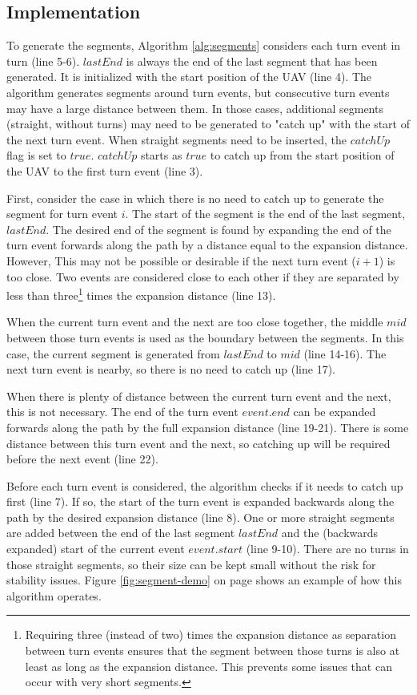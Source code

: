 \subsection{Implementation}
To generate the segments, Algorithm \ref{alg:segments} considers each turn event in turn (line 5-6). $lastEnd$ is always the end of the last segment that has been generated. It is initialized with the start position of the UAV (line 4). The algorithm generates segments around turn events, but consecutive turn events may have a large distance between them. In those cases, additional segments (straight, without turns) may need to be generated to "catch up" with the start of the next turn event. When straight segments need to be inserted, the $catchUp$ flag is set to $true$. $catchUp$ starts as $true$ to catch up from the start position of the UAV to the first turn event (line 3).
\par
First, consider the case in which there is no need to catch up to generate the segment for turn event $i$. The start of the segment is the end of the last segment, $lastEnd$. The desired end of the segment is found by expanding the end of the turn event forwards along the path by a distance equal to the expansion distance. However, This may not be possible or desirable if the next turn event ($i+1$) is too close. Two events are considered close to each other if they are separated by less than three\footnote{Requiring three (instead of two) times the expansion distance as separation between turn events ensures that the segment between those turns is also at least as long as the expansion distance. This prevents some issues that can occur with very short segments.} times the expansion distance (line 13). 
\par
When the current turn event and the next are too close together, the middle $mid$ between those turn events is used as the boundary between the segments. In this case, the current segment is generated from $lastEnd$ to $mid$ (line 14-16). The next turn event is nearby, so there is no need to catch up (line 17). 
\par
When there is plenty of distance between the current turn event and the next, this is not necessary. The end of the turn event $event.end$ can be expanded forwards along the path by the full expansion distance (line 19-21). There is some distance between this turn event and the next, so catching up will be required before the next event (line 22).
\par
Before each turn event is considered, the algorithm checks if it needs to catch up first (line 7). If so, the start of the turn event is expanded backwards along the path by the desired expansion distance (line 8). One or more straight segments are added between the end of the last segment $lastEnd$ and the (backwards expanded) start of the current event $event.start$ (line 9-10). There are no turns in those straight segments, so their size can be kept small without the risk for stability issues. Figure \ref{fig:segment-demo} on page \pageref{fig:segment-demo} shows an example of how this algorithm operates.

